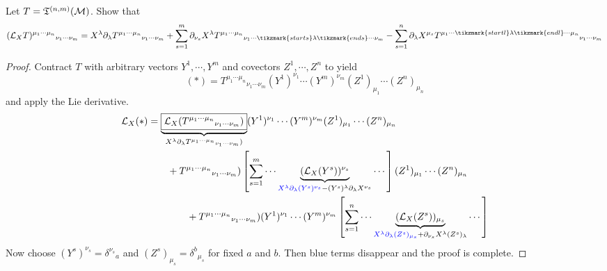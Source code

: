 \documentclass[a4paper, 10pt]{article}
\begin{document}

\begin{exer}
    Let $T = \mathfrak{T}^{(n,m)}(\mathcal{M})$. Show that
    \[ (\mca{L}_{X}T)^{\mu_{1}\cdots\mu_{n}}{}_{\nu_{1}\cdots\nu_{m}} = X^{\lambda}\partial_{\lambda}T^{\mu_{1}\cdots\mu_{n}}{}_{\nu_{1}\cdots\nu_{m}} + \sum_{s=1}^{m}\partial_{\nu_{s}}X^{\lambda}T^{\mu_{1}\cdots\mu_{n}}{}_{\nu_{1}\cdots{\tikzmark{starts}\lambda\tikzmark{ends}}\cdots\nu_{m}} - \sum_{s=1}^{n}\partial_{\lambda}X^{\mu_{s}}T^{\mu_{1}\cdots{\tikzmark{startl}\lambda\tikzmark{endl}}\cdots\mu_{n}}{}_{\nu_{1}\cdots\nu_{m}} \]

\end{exer}

\begin{proof}
    Contract $T$ with arbitrary vectors $Y^{1},\cdots,Y^{m}$ and covectors $Z^{1},\cdots,Z^{n}$ to yield
    \[ (\ast) = T^{\mu_{1}\cdots\mu_{n}}{}_{\nu_{1}\cdots\nu_{m}}(Y^{1})^{\nu_{1}}\cdots(Y^{m})^{\nu_{m}}(Z^{1})_{\mu_{1}}\cdots(Z^{n})_{\mu_{n}} \]
    and apply the Lie derivative.
    \begin{align*}
        \mathcal{L}_{X}(\ast) &= \underbrace{\boxed{\mathcal{L}_{X}(T^{\mu_{1}\cdots\mu_{n}}{}_{\nu_{1}\cdots\nu_{m}})}}_{X^{\lambda}\partial_{\lambda}T^{\mu_{1}\cdots\mu_{n}}{}_{\nu_{1}\cdots\nu_{m}})}(Y^{1})^{\nu_{1}}\cdots(Y^{m})^{\nu_{m}}(Z^{1})_{\mu_{1}}\cdots(Z^{n})_{\mu_{n}} \\
        &\qquad+T^{\mu_{1}\cdots\mu_{n}}{}_{\nu_{1}\cdots\nu_{m}})\left[\sum_{s=1}^{m}\cdots\underbrace{(\mathcal{L}_{X}(Y^{s}))^{\nu_{s}}}_{\textcolor{blue}{X^{\lambda}\partial_{\lambda}(Y^{s})^{\nu_{s}}}-(Y^{s})^{\lambda}\partial_{\lambda}X^{\nu_{s}}}\cdots\right](Z^{1})_{\mu_{1}}\cdots(Z^{n})_{\mu_{n}} \\
        &\qquad\qquad+ T^{\mu_{1}\cdots\mu_{n}}{}_{\nu_{1}\cdots\nu_{m}})(Y^{1})^{\nu_{1}}\cdots(Y^{m})^{\nu_{m}}\left[\sum_{s=1}^{n}\cdots\underbrace{(\mathcal{L}_{X}(Z^{s}))_{\mu_{s}}}_{\textcolor{blue}{X^{\lambda}\partial_{\lambda}(Z^{s})_{\mu_{s}}} + \partial_{\nu_{s}}X^{\lambda}(Z^{s})_{\lambda}}\cdots\right]
    \end{align*}
    Now choose $(Y^{s})^{\nu_{s}} = \delta^{\nu_{s}}{}_{a}$ and $(Z^{s})_{\mu_{s}} = \delta^{b}{}_{\mu_{s}}$ for fixed $a$ and $b$. Then blue terms disappear and the proof is complete.
\end{proof}
\end{document}
